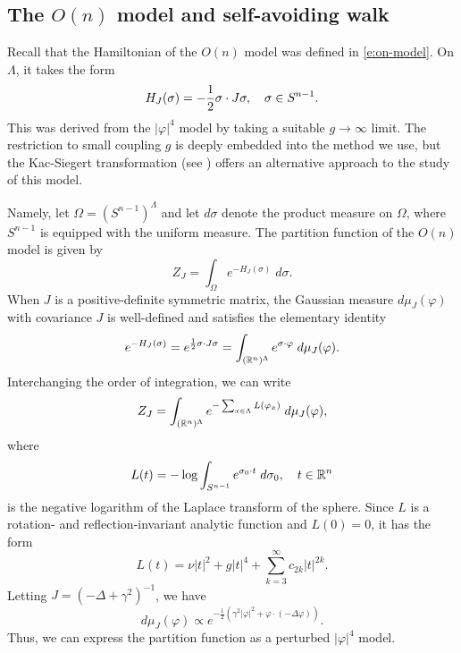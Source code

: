 
\subsection{The \texorpdfstring{$O(n)$}{O(n)} model and self-avoiding walk}
\label{sec:hard-core}

Recall that the Hamiltonian of the $O(n)$ model was defined in \eqref{e:on-model}.
On $\Lambda$, it takes the form
\begin{equation}
H_J(\sigma)
	=
-\frac12 \sigma \cdot J \sigma,
	\quad
{\sigma\in S^{n-1}}.
\end{equation}
This was derived from the $|\varphi|^4$ model by taking a suitable
$g\to\infty$ limit. The restriction to small coupling $g$ is deeply embedded into
the method we use, but the Kac-Siegert transformation (see \cite{Bryd09}) offers
an alternative approach to the study of this model.

Namely, let $\Omega = (S^{n-1})^\Lambda$ and let $d\sigma$ denote the product measure on $\Omega$,
where $S^{n-1}$ is equipped with the uniform
measure. The partition function of the $O(n)$ model is given by
\begin{equation}
Z_J = \int_\Omega e^{-H_J(\sigma)} \; d\sigma.
\end{equation}
When $J$ is a positive-definite symmetric matrix, the Gaussian measure $d\mu_J(\varphi)$
with covariance $J$ is well-defined and satisfies the elementary identity
\begin{equation}
{e^{-H_J(\sigma)}}
	=
e^{\frac12 \sigma \cdot J \sigma}
	=
\int_{({\mathbb R}^n)^\Lambda} e^{\sigma \cdot \varphi} \; d\mu_J(\varphi).
\end{equation}
Interchanging the order of integration, we can write
\begin{equation}
Z_J
	=
\int_{({\mathbb R}^n)^\Lambda}
e^{-\sum_{x\in\Lambda} L(\varphi_x)}
\; d\mu_J(\varphi),
\end{equation}
where
\begin{equation}
L(t)
	=
-\log
\int_{S^{n-1}} e^{\sigma_0 \cdot t} \; d\sigma_0,
	\quad
t\in{\mathbb R}^n
\end{equation}
is the negative logarithm of the Laplace transform of the sphere. Since $L$ is
a rotation- and reflection-invariant analytic function and $L(0) = 0$, it has
the form
\begin{equation}
\label{e:logLaplace}
L(t) = \nu |t|^2 + g |t|^4 + \sum_{k=3}^\infty c_{2k} |t|^{2k}.
\end{equation}
Letting $J = (-\Delta + \gamma^2)^{-1}$, we have
\begin{equation}
d\mu_J(\varphi)
	\propto
e^{-\frac12 (\gamma^2 |\varphi|^2 + \varphi \cdot (-\Delta \varphi))}.
\end{equation}
Thus, we can express the partition function as a perturbed $|\varphi|^4$ model.

